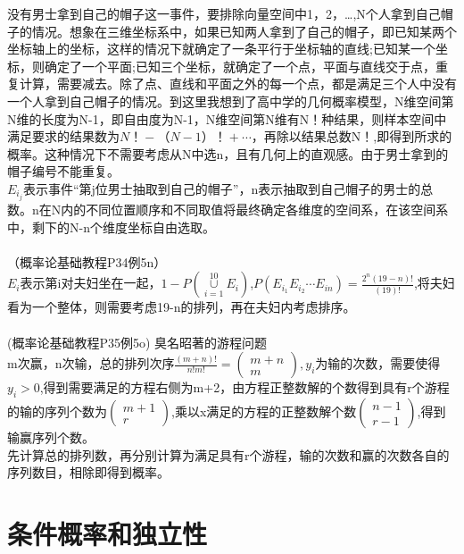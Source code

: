 \documentclass{book}%
\begin{document}
     没有男士拿到自己的帽子这一事件，要排除向量空间中1，2，\dots ,N个人拿到自己帽子的情况。想象在三维坐标系中，如果已知两人拿到了自己的帽子，即已知某两个坐标轴上的坐标，这样的情况下就确定了一条平行于坐标轴的直线;已知某一个坐标，则确定了一个平面;已知三个坐标，就确定了一个点，平面与直线交于点，重复计算，需要减去。除了点、直线和平面之外的每一个点，都是满足三个人中没有一个人拿到自己帽子的情况。到这里我想到了高中学的几何概率模型，N维空间第N维的长度为N-1，即自由度为N-1，N维空间第N维有N！种结果，则样本空间中满足要求的结果数为$N！-（N-1）！+\cdots$，再除以结果总数N！,即得到所求的概率。这种情况下不需要考虑从N中选n，且有几何上的直观感。由于男士拿到的帽子编号不能重复。\\
    $E_{i_{j}}$表示事件“第j位男士抽取到自己的帽子”，n表示抽取到自己帽子的男士的总数。n在N内的不同位置顺序和不同取值将最终确定各维度的空间系，在该空间系中，剩下的N-n个维度坐标自由选取。\\
    ~\\
    
    （概率论基础教程P34例5n）\\
    $E_{i}$表示第i对夫妇坐在一起，$1-P(\mathop\cup\limits_{i=1}^{10}E_{i})$,$P(E_{i_{1}}E_{i_{2}}\cdots E_{i{n}})=\frac{2^{n}(19-n)!}{(19)!}$,将夫妇看为一个整体，则需要考虑19-n的排列，再在夫妇内考虑排序。\\
    ~\\
    
    (概率论基础教程P35例5o)
    臭名昭著的游程问题\\
    m次赢，n次输，总的排列次序$\frac{(m+n)!}{n!m!}=\begin{pmatrix}
    	m+n\\m
    \end{pmatrix},$$y_{i}$为输的次数，需要使得$y_{i}>0$,得到需要满足的方程右侧为m+2，由方程正整数解的个数得到具有r个游程的输的序列个数为$\begin{pmatrix}m+1\\r\end{pmatrix}$,乘以x满足的方程的正整数解个数$\begin{pmatrix}n-1\\r-1\end{pmatrix}$,得到输赢序列个数。\\
    先计算总的排列数，再分别计算为满足具有r个游程，输的次数和赢的次数各自的序列数目，相除即得到概率。\\
    
    \section{条件概率和独立性}
    
\end{document}
